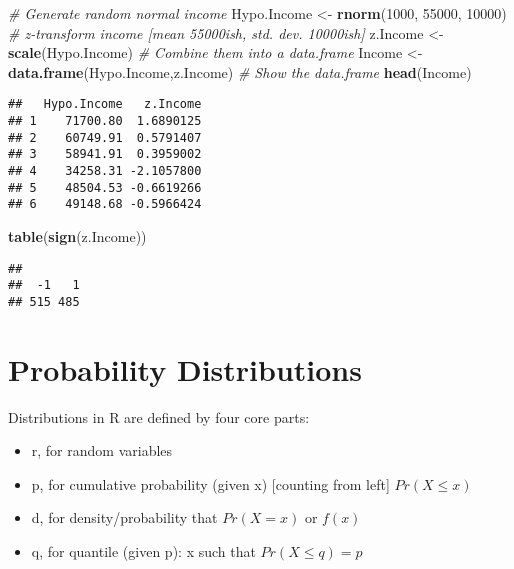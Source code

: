 \documentclass[ignorenonframetext,]{beamer}
\newenvironment{Shaded}{\begin{snugshade}}{\end{snugshade}}
\newcommand{\CommentTok}[1]{\textcolor[rgb]{0.56,0.35,0.01}{\textit{#1}}}
\newcommand{\DecValTok}[1]{\textcolor[rgb]{0.00,0.00,0.81}{#1}}
\newcommand{\KeywordTok}[1]{\textcolor[rgb]{0.13,0.29,0.53}{\textbf{#1}}}
\newcommand{\NormalTok}[1]{#1}
\newcommand{\StringTok}[1]{\textcolor[rgb]{0.31,0.60,0.02}{#1}}
\providecommand{\tightlist}{%
  \setlength{\itemsep}{0pt}\setlength{\parskip}{0pt}}
\begin{document}
\begin{frame}[fragile]

\begin{Shaded}
\begin{Highlighting}[]
\CommentTok{# Generate random normal income}
\NormalTok{Hypo.Income <-}\StringTok{ }\KeywordTok{rnorm}\NormalTok{(}\DecValTok{1000}\NormalTok{, }\DecValTok{55000}\NormalTok{, }\DecValTok{10000}\NormalTok{)}
\CommentTok{# z-transform income [mean 55000ish, std. dev. 10000ish]}
\NormalTok{z.Income <-}\StringTok{ }\KeywordTok{scale}\NormalTok{(Hypo.Income)}
\CommentTok{# Combine them into a data.frame}
\NormalTok{Income <-}\StringTok{ }\KeywordTok{data.frame}\NormalTok{(Hypo.Income,z.Income)}
\CommentTok{# Show the data.frame}
\KeywordTok{head}\NormalTok{(Income)}
\end{Highlighting}
\end{Shaded}

\begin{verbatim}
##   Hypo.Income   z.Income
## 1    71700.80  1.6890125
## 2    60749.91  0.5791407
## 3    58941.91  0.3959002
## 4    34258.31 -2.1057800
## 5    48504.53 -0.6619266
## 6    49148.68 -0.5966424
\end{verbatim}

\begin{Shaded}
\begin{Highlighting}[]
\KeywordTok{table}\NormalTok{(}\KeywordTok{sign}\NormalTok{(z.Income))}
\end{Highlighting}
\end{Shaded}

\begin{verbatim}
## 
##  -1   1 
## 515 485
\end{verbatim}

\end{frame}

\hypertarget{probability-distributions}{%
\section{Probability Distributions}\label{probability-distributions}}

Distributions in R are defined by four core parts:

\begin{itemize}[<+->]
\tightlist
\item
  r, for random variables
\item
  p, for cumulative probability (given x) {[}counting from left{]}
  \(Pr(X\leq x)\)
\item
  d, for density/probability that \(Pr(X=x)\) or \(f(x)\)
\item
  q, for quantile (given p): x such that \(Pr(X\leq q)=p\)
\end{itemize}
\end{document}
